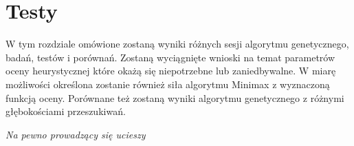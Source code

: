 \chapter{Testy}
\thispagestyle{chapterBeginStyle}

{\color{dgray}
W tym rozdziale omówione zostaną wyniki różnych sesji algorytmu genetycznego, badań, testów i porównań. Zostaną wyciągnięte wnioski na temat parametrów oceny heurystycznej które okażą się niepotrzebne lub zaniedbywalne. W miarę możliwości określona zostanie również siła algorytmu Minimax z wyznaczoną funkcją oceny. Porównane też zostaną wyniki algorytmu genetycznego z różnymi głębokościami przeszukiwań.
}

\textit{Na pewno prowadzący się ucieszy}

